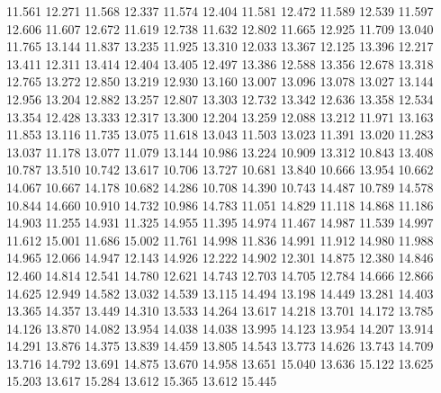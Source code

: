 {        11.561 12.271
        11.568 12.337
        11.574 12.404
        11.581 12.472
        11.589 12.539
        11.597 12.606
        11.607 12.672
        11.619 12.738
        11.632 12.802
        11.665 12.925
        11.709 13.040
        11.765 13.144
        11.837 13.235
        11.925 13.310
        12.033 13.367
        12.125 13.396
        12.217 13.411
        12.311 13.414
        12.404 13.405
        12.497 13.386
        12.588 13.356
        12.678 13.318
        12.765 13.272
        12.850 13.219
        12.930 13.160
        13.007 13.096
        13.078 13.027
        13.144 12.956
        13.204 12.882
        13.257 12.807
        13.303 12.732
        13.342 12.636
        13.358 12.534
        13.354 12.428
        13.333 12.317
        13.300 12.204
        13.259 12.088
        13.212 11.971
        13.163 11.853
        13.116 11.735
        13.075 11.618
        13.043 11.503
        13.023 11.391
        13.020 11.283
        13.037 11.178
        13.077 11.079
        13.144 10.986
        13.224 10.909
        13.312 10.843
        13.408 10.787
        13.510 10.742
        13.617 10.706
        13.727 10.681
        13.840 10.666
        13.954 10.662
        14.067 10.667
        14.178 10.682
        14.286 10.708
        14.390 10.743
        14.487 10.789
        14.578 10.844
        14.660 10.910
        14.732 10.986
        14.783 11.051
        14.829 11.118
        14.868 11.186
        14.903 11.255
        14.931 11.325
        14.955 11.395
        14.974 11.467
        14.987 11.539
        14.997 11.612
        15.001 11.686
        15.002 11.761
        14.998 11.836
        14.991 11.912
        14.980 11.988
        14.965 12.066
        14.947 12.143
        14.926 12.222
        14.902 12.301
        14.875 12.380
        14.846 12.460
        14.814 12.541
        14.780 12.621
        14.743 12.703
        14.705 12.784
        14.666 12.866
        14.625 12.949
        14.582 13.032
        14.539 13.115
        14.494 13.198
        14.449 13.281
        14.403 13.365
        14.357 13.449
        14.310 13.533
        14.264 13.617
        14.218 13.701
        14.172 13.785
        14.126 13.870
        14.082 13.954
        14.038 14.038
        13.995 14.123
        13.954 14.207
        13.914 14.291
        13.876 14.375
        13.839 14.459
        13.805 14.543
        13.773 14.626
        13.743 14.709
        13.716 14.792
        13.691 14.875
        13.670 14.958
        13.651 15.040
        13.636 15.122
        13.625 15.203
        13.617 15.284
        13.612 15.365
        13.612 15.445
}
